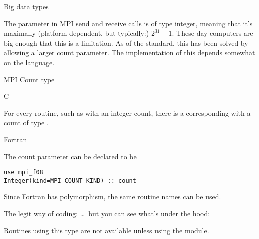 
 {Big data types}
\label{sec:mpi-bigdata}

The  parameter in MPI send and receive calls is of type integer,
meaning that it's maximally
(platform-dependent, but typically:)
$2^{31}-1$.
These day computers are big enough
that this is a limitation.
As of the  standard, this has been solved by allowing a
larger count parameter.
The implementation of this depends somewhat on the language.

\begin{mpifournote}{MPI Count type}

 {C}
\label{sec:c-mpi-count}

For every routine, such as  with an integer count,
there is a corresponding  with a count
of type .


{
\def\snippetcodefraction{.45}
\def\snippetlistfraction{.5}  
}

 {Fortran}
\label{sec:f-largecount}

The count parameter can be declared  to be
\lstset{language=Fortran}
\begin{lstlisting}
use mpi_f08
Integer(kind=MPI_COUNT_KIND) :: count
\end{lstlisting}
\lstset{language=C}
Since Fortran has polymorphism, the same routine names can be used.

\begin{multicols}{2}
  The legit way of coding:
  \lstset{xleftmargin=0pt}
  \columnbreak
  \ldots~but you can see what's under the hood:
  \lstset{xleftmargin=0pt}
\end{multicols}

Routines using this type are not available
unless using the  module.
\end{mpifournote}

